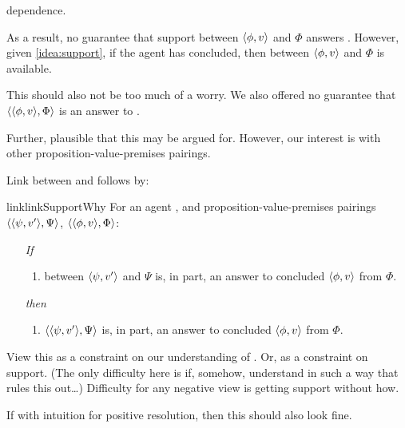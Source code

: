 \begin{note}
  \qWhyV{} dependence.

  As a result, no guarantee that support between \(\langle \phi, v \rangle\) and \(\Phi\) answers \qWhyV{}.
  However, given \autoref{idea:support}, if the agent has concluded, then \support{} between \(\langle \phi, v \rangle\) and \(\Phi\) is available.

  This should also not be too much of a worry.
  We also offered no guarantee that \(\langle \langle \phi, v \rangle, \Phi \rangle\) is an answer to \qWhy{}.

  Further, plausible that this may be argued for.
  However, our interest is with other proposition-value-premises pairings.
\end{note}

\begin{note}
  Link between \qWhy{} and \qWhyV{} follows by:

  \begin{restatable}{link}{linkSupportWhy}
    \label{link:why:support:pvpp}
    For an agent \vAgent{}, and proposition-value-premises pairings \(\langle \langle \psi, v' \rangle, \Psi \rangle\), \(\langle \langle \phi, v \rangle, \Phi \rangle\):

    \begin{itemize}
    \item[\emph{If}]
      \begin{enumerate}[label=\alph*., ref=(\alph*)]
      \item
         between \(\langle \psi, v' \rangle\) and \(\Psi\) is, in part, an answer to \qWhyV{} \vAgent{} concluded \(\langle \phi, v \rangle\) from \(\Phi\).
      \end{enumerate}
    \item[\emph{then}]
      \begin{enumerate}[label=\alph*., ref=(\alph*), resume]
      \item
        \(\langle \langle \psi, v' \rangle, \Psi \rangle\) is, in part, an answer to \qWhy{} \vAgent{} concluded \(\langle \phi, v \rangle\) from \(\Phi\).
      \end{enumerate}
    \end{itemize}
    \vspace{-\baselineskip}
  \end{restatable}
  {
    \color{red}
    View this as a constraint on our understanding of \qWhy{}.
    Or, as a constraint on support.
    (The only difficulty here is if, somehow, understand \qWhy{} in such a way that rules this out\dots)
  }
  Difficulty for any negative view is getting support without how.

  If with intuition for positive resolution, then this should also look fine.
\end{note}


